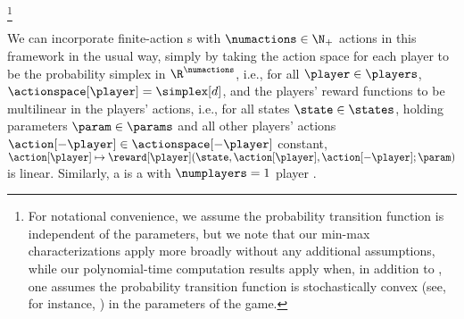 \footnote{For notational convenience, 
we assume the probability transition function is independent of the parameters, but we note that our min-max characterizations apply more broadly without any additional assumptions, while our polynomial-time computation results apply when, in addition to , one assumes the probability transition function is stochastically convex (see, for instance, \citet{atakan2003stochastic}) in the parameters of the game.}


  
We can incorporate finite-action s with $\numactions \in \N_+$ 
actions in this framework in the usual way, simply by taking the action space for each player to be the probability simplex in $\R^{\numactions}$, i.e., for all $\player \in \players$, $\actionspace[\player] = \simplex[{d}]$, and the players' reward functions to be multilinear in the players' actions, i.e., for all states $\state \in \states$, holding parameters $\param \in \params$ and all other players' actions $\action[-\player] \in \actionspace[-\player]$ constant, $\action[\player] \mapsto \reward[\player] (\state, \action[\player], \action[-\player]; \param)$ is linear.
Similarly, a  is a  with $\numplayers = 1$ player \citep{bellman1966dynamic}.
\fi


